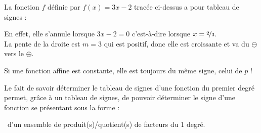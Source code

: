 \documentclass[a4paper,11pt]{article}
\begin{document}
\begin{cexemple}
La fonction $f$ définie par $f(x)=3x-2$ tracée ci-dessus a pour tableau de signes :
\begin{center}
\end{center}
En effet, elle s'annule lorsque $3x-2=0$ c'est-à-dire lorsque $x=\nicefrac{2}{3}$.\\ La pente de la droite est $m=3$ qui est positif, donc elle est croissante et va du $\ominus$ vers le $\oplus$.
\end{cexemple}

\begin{crmq}[s]
Si une fonction affine est constante, elle est toujours du même signe, celui de $p$ !

\smallskip

Le fait de savoir déterminer le tableau de signes d'une fonction \og du premier degré \fg{} permet, grâce à un tableau de signes, de pouvoir déterminer le signe d'une fonction se présentant sous la forme :

\hfill~d'un ensemble de produit(s)/quotient(s) de facteurs du 1 degré.\hfill~
\end{crmq}
\end{document}
